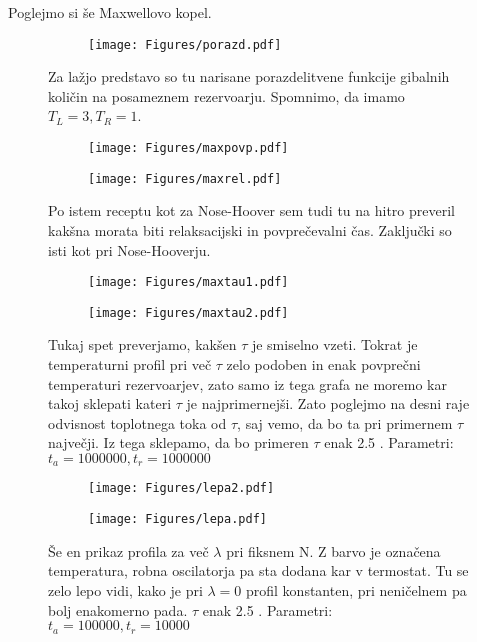\documentclass{article}
\begin{document}
Poglejmo si še Maxwellovo kopel.

\begin{figure}[H]
\centering
\begin{subfigure}{.6\textwidth}
\texttt{[image: Figures/porazd.pdf]}
\end{subfigure}
\caption*{Za lažjo predstavo so tu narisane porazdelitvene funkcije gibalnih količin na posameznem rezervoarju. Spomnimo, da imamo $T_L=3, T_R=1$.}
\end{figure}

\begin{figure}[H]
\centering
\begin{subfigure}{.49\textwidth}
\texttt{[image: Figures/maxpovp.pdf]}
\end{subfigure}
\begin{subfigure}{.49\textwidth}
\texttt{[image: Figures/maxrel.pdf]}
\end{subfigure}
\caption*{Po istem receptu kot za Nose-Hoover sem tudi tu na hitro preveril kakšna morata biti relaksacijski in povprečevalni čas. Zaključki so isti kot pri Nose-Hooverju.}
\end{figure}

\begin{figure}[H]
\centering
\begin{subfigure}{.49\textwidth}
\texttt{[image: Figures/maxtau1.pdf]}
\end{subfigure}
\begin{subfigure}{.49\textwidth}
\texttt{[image: Figures/maxtau2.pdf]}
\end{subfigure}
\caption*{Tukaj spet preverjamo, kakšen $\tau$ je smiselno vzeti. Tokrat je temperaturni profil pri več $\tau$ zelo podoben in enak povprečni temperaturi rezervoarjev, zato samo iz tega grafa ne moremo kar takoj sklepati kateri $\tau$ je najprimernejši. Zato poglejmo na desni raje odvisnost toplotnega toka od $\tau$, saj vemo, da bo ta pri primernem $\tau$ največji. Iz tega sklepamo, da bo primeren $\tau$ enak 2.5 . Parametri: $ t_a=1000000, t_r=1000000$}
\end{figure}

\begin{figure}[H]
\centering
\begin{subfigure}{.49\textwidth}
\texttt{[image: Figures/lepa2.pdf]}
\end{subfigure}
\begin{subfigure}{.49\textwidth}
\texttt{[image: Figures/lepa.pdf]}
\end{subfigure}
\caption*{Še en prikaz profila za več $\lambda$ pri fiksnem N. Z barvo je označena temperatura, robna oscilatorja pa sta dodana kar v termostat. Tu se zelo lepo vidi, kako je pri $\lambda=0$ profil konstanten, pri neničelnem pa bolj enakomerno pada. $\tau$ enak 2.5 . Parametri: $ t_a=100000, t_r=10000$}
\end{figure}
\end{document}
